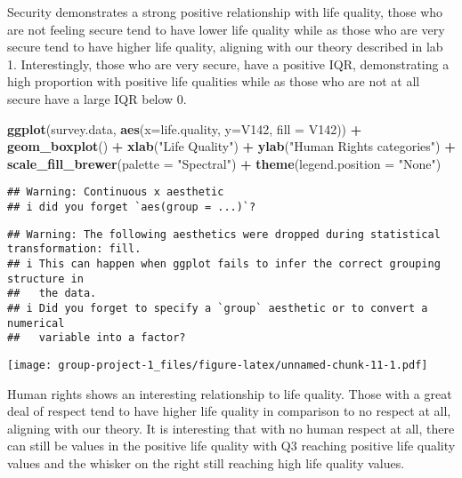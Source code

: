 \documentclass[
]{article}
\newenvironment{Shaded}{\begin{snugshade}}{\end{snugshade}}
\newcommand{\AttributeTok}[1]{\textcolor[rgb]{0.13,0.29,0.53}{#1}}
\newcommand{\FunctionTok}[1]{\textcolor[rgb]{0.13,0.29,0.53}{\textbf{#1}}}
\newcommand{\NormalTok}[1]{#1}
\newcommand{\SpecialCharTok}[1]{\textcolor[rgb]{0.81,0.36,0.00}{\textbf{#1}}}
\newcommand{\StringTok}[1]{\textcolor[rgb]{0.31,0.60,0.02}{#1}}
\begin{document}
Security demonstrates a strong positive relationship with life quality,
those who are not feeling secure tend to have lower life quality while
as those who are very secure tend to have higher life quality, aligning
with our theory described in lab 1. Interestingly, those who are very
secure, have a positive IQR, demonstrating a high proportion with
positive life qualities while as those who are not at all secure have a
large IQR below 0.

\begin{Shaded}
\begin{Highlighting}[]
\FunctionTok{ggplot}\NormalTok{(survey.data, }\FunctionTok{aes}\NormalTok{(}\AttributeTok{x=}\NormalTok{life.quality, }\AttributeTok{y=}\NormalTok{V142, }\AttributeTok{fill =}\NormalTok{ V142)) }\SpecialCharTok{+} 
  \FunctionTok{geom\_boxplot}\NormalTok{() }\SpecialCharTok{+}
  \FunctionTok{xlab}\NormalTok{(}\StringTok{"Life Quality"}\NormalTok{) }\SpecialCharTok{+}
  \FunctionTok{ylab}\NormalTok{(}\StringTok{"Human Rights categories"}\NormalTok{) }\SpecialCharTok{+}
  \FunctionTok{scale\_fill\_brewer}\NormalTok{(}\AttributeTok{palette =} \StringTok{"Spectral"}\NormalTok{) }\SpecialCharTok{+}
  \FunctionTok{theme}\NormalTok{(}\AttributeTok{legend.position =} \StringTok{"None"}\NormalTok{)}
\end{Highlighting}
\end{Shaded}

\begin{verbatim}
## Warning: Continuous x aesthetic
## i did you forget `aes(group = ...)`?
\end{verbatim}

\begin{verbatim}
## Warning: The following aesthetics were dropped during statistical transformation: fill.
## i This can happen when ggplot fails to infer the correct grouping structure in
##   the data.
## i Did you forget to specify a `group` aesthetic or to convert a numerical
##   variable into a factor?
\end{verbatim}

\texttt{[image: group-project-1\_files/figure-latex/unnamed-chunk-11-1.pdf]}

Human rights shows an interesting relationship to life quality. Those
with a great deal of respect tend to have higher life quality in
comparison to no respect at all, aligning with our theory. It is
interesting that with no human respect at all, there can still be values
in the positive life quality with Q3 reaching positive life quality
values and the whisker on the right still reaching high life quality
values.
\end{document}
